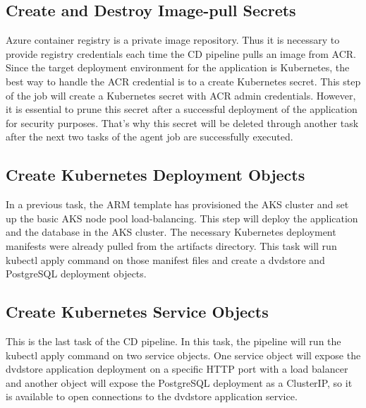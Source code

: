 \subsection{Create and Destroy Image-pull Secrets}
Azure container registry is a private image repository. Thus it is necessary to provide registry credentials each time the CD pipeline pulls an image from ACR. Since the target deployment environment for the application is Kubernetes, the best way to handle the ACR credential is to a create Kubernetes secret. This step of the job will create a Kubernetes secret with ACR admin credentials. However, it is essential to prune this secret after a successful deployment of the application for security purposes. That's why this secret will be deleted through another task after the next two tasks of the agent job are successfully executed. 

\subsection{Create Kubernetes Deployment Objects}
In a previous task, the ARM template has provisioned the AKS cluster and set up the basic AKS node pool load-balancing. This step will deploy the application and the database in the AKS cluster. The necessary Kubernetes deployment manifests were already pulled from the artifacts directory. This task will run kubectl apply command on those manifest files and create a dvdstore and PostgreSQL deployment objects.

\subsection{Create Kubernetes Service Objects}
This is the last task of the CD pipeline. In this task, the pipeline will run the kubectl apply command on two service objects. One service object will expose the dvdstore application deployment on a specific HTTP port with a load balancer and another object will expose the PostgreSQL deployment as a ClusterIP, so it is available to open connections to the dvdstore application service.





